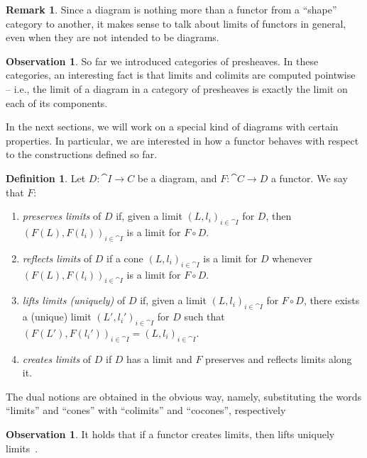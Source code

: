 \documentclass[a4paper, twoside,openright]{report}
\theoremstyle{plain}
\theoremstyle{definition}
\newtheorem{definition}[theorem]{Definition}
\newtheorem{remark}[theorem]{Remark}
\newtheorem{obs}[theorem]{Observation}
\begin{document}
\begin{remark}
    Since a diagram is nothing more than a functor from a ``shape'' category to another, it makes sense to talk about limits of functors in general, even when they are not intended to be diagrams.
\end{remark}

\begin{obs}\label{obs:limits_in_presh}
    So far we introduced categories of presheaves. In these categories, an interesting fact is that limits and colimits are computed pointwise -- i.e., the limit of a diagram in a category of presheaves is exactly the limit on each of its components.
\end{obs}

In the next sections, we will work on a special kind of diagrams with certain properties. In particular, we are interested in how a functor behaves with respect to the constructions defined so far.

\begin{definition}
    Let $D : \cat{I \rightarrow C}$ be a diagram, and $F: \cat{C \rightarrow D}$ a functor. We say that $F$:
    \begin{enumerate}
        \item \emph{preserves limits} of $D$ if, given a limit $(L, l_i)_{i \in \cat I}$ for $D$, then $(F(L), F(l_i))_{i \in \cat I}$ is a limit for $F \circ D$.
        \item \emph{reflects limits} of $D$ if a cone $(L, l_i)_{i \in \cat I}$ is a limit for $D$ whenever $(F(L), F(l_i))_{i \in \cat I}$ is a limit for $F \circ D$.
        \item \emph{lifts limits (uniquely)} of $D$ if, given a limit $(L, l_i)_{i \in \cat I}$ for $F \circ D$, there exists a (unique) limit $(L', l_i')_{i \in \cat I}$ for $D$ such that $(F(L'), F(l_i'))_{i \in \cat I} = (L, l_i)_{i \in \cat I}$.
        \item \emph{creates limits} of $D$ if $D$ has a limit and $F$ preserves and reflects limits along it.
    \end{enumerate}
    The dual notions are obtained in the obvious way, namely, substituting the words ``limits'' and ``cones'' with ``colimits'' and ``cocones'', respectively
\end{definition}

\begin{obs}\label{obs:funct_creat_lim_then_lift}
    It holds that if a functor creates limits, then lifts uniquely limits~\cite{Adamek_Herrlich_Strecker_2009}.
\end{obs}
\end{document}
